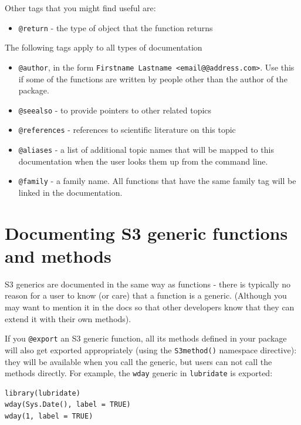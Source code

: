 Other tags that you might find useful are:

\begin{itemize}
\itemsep1pt\parskip0pt
\item
  \texttt{@return} - the type of object that the function returns
\end{itemize}

The following tags apply to all types of documentation

\begin{itemize}
\item
  \texttt{@author}, in the form
  \texttt{Firstname Lastname \textless{}email@@address.com\textgreater{}}.
  Use this if some of the functions are written by people other than the
  author of the package.
\item
  \texttt{@seealso} - to provide pointers to other related topics
\item
  \texttt{@references} - references to scientific literature on this
  topic
\item
  \texttt{@aliases} - a list of additional topic names that will be
  mapped to this documentation when the user looks them up from the
  command line.
\item
  \texttt{@family} - a family name. All functions that have the same
  family tag will be linked in the documentation.
\end{itemize}

\section{Documenting S3 generic functions and methods}

S3 generics are documented in the same way as functions - there is
typically no reason for a user to know (or care) that a function is a
generic. (Although you may want to mention it in the docs so that other
developers know that they can extend it with their own methods).

If you \texttt{@export} an S3 generic function, all its methods defined
in your package will also get exported appropriately (using the
\texttt{S3method()} namespace directive): they will be available when
you call the generic, but users can not call the methods directly. For
example, the \texttt{wday} generic in \texttt{lubridate} is exported:

\begin{verbatim}
library(lubridate)
wday(Sys.Date(), label = TRUE)
wday(1, label = TRUE)
\end{verbatim}

